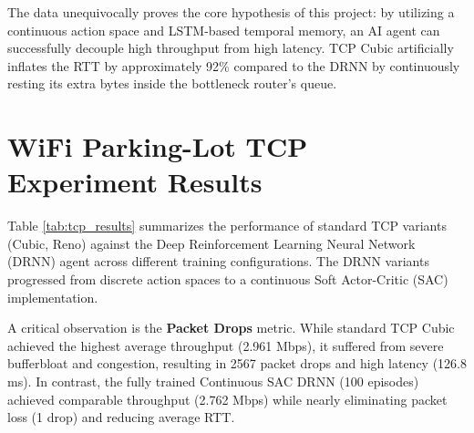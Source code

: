 \documentclass[12pt, a4paper]{article}
\begin{document}
The data unequivocally proves the core hypothesis of this project: by utilizing a continuous action space and LSTM-based temporal memory, an AI agent can successfully decouple high throughput from high latency. TCP Cubic artificially inflates the RTT by approximately 92\% compared to the DRNN by continuously resting its extra bytes inside the bottleneck router's queue.

\newpage
\section*{WiFi Parking-Lot TCP Experiment Results}

Table \ref{tab:tcp_results} summarizes the performance of standard TCP variants (Cubic, Reno) against the Deep Reinforcement Learning Neural Network (DRNN) agent across different training configurations. The DRNN variants progressed from discrete action spaces to a continuous Soft Actor-Critic (SAC) implementation.

A critical observation is the \textbf{Packet Drops} metric. While standard TCP Cubic achieved the highest average throughput (2.961 Mbps), it suffered from severe bufferbloat and congestion, resulting in 2567 packet drops and high latency (126.8 ms). In contrast, the fully trained Continuous SAC DRNN (100 episodes) achieved comparable throughput (2.762 Mbps) while nearly eliminating packet loss (1 drop) and reducing average RTT.
\end{document}
